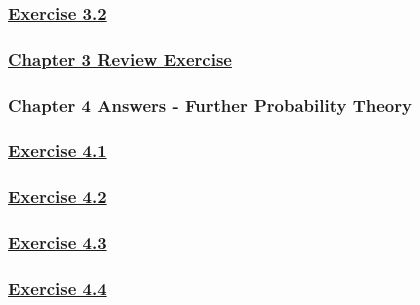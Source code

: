 \documentclass[
  11pt,
]{book}
\begin{document}
\subsubsection*{\texorpdfstring{\hyperref[ex32q]{Exercise 3.2}}{Exercise 3.2}}\label{exercise-3.2-1}

\subsubsection*{\texorpdfstring{\hyperref[re3q]{Chapter 3 Review Exercise}}{Chapter 3 Review Exercise}}\label{chapter-3-review-exercise}

\subsubsection*{Chapter 4 Answers - Further Probability Theory}\label{chapter-4-answers---further-probability-theory}

\subsubsection*{\texorpdfstring{\hyperref[ex41q]{Exercise 4.1}}{Exercise 4.1}}\label{exercise-4.1-1}

\subsubsection*{\texorpdfstring{\hyperref[ex42q]{Exercise 4.2}}{Exercise 4.2}}\label{exercise-4.2-1}

\subsubsection*{\texorpdfstring{\hyperref[ex43q]{Exercise 4.3}}{Exercise 4.3}}\label{exercise-4.3-1}

\subsubsection*{\texorpdfstring{\hyperref[ex44q]{Exercise 4.4}}{Exercise 4.4}}\label{exercise-4.4-1}
\end{document}
